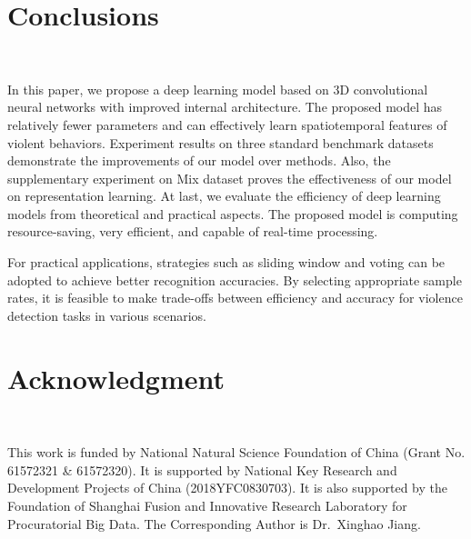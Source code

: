 \documentclass[10pt,twocolumn,letterpaper]{article}
\begin{document}

\section{Conclusions}
~\label{sec:5}

In this paper, we propose a deep learning model based on 3D convolutional neural networks with improved internal architecture. 
The proposed model has relatively fewer parameters and can effectively learn spatiotemporal features of violent behaviors. 
Experiment results on three standard benchmark datasets demonstrate the improvements of our model over methods. 
Also, the supplementary experiment on Mix dataset proves the effectiveness of our model on representation learning. 
At last, we evaluate the efficiency of deep learning models from theoretical and practical aspects.
The proposed model is computing resource-saving, very efficient, and capable of real-time processing. 

For practical applications, strategies such as sliding window and voting can be adopted to achieve better recognition accuracies. 
By selecting appropriate sample rates, it is feasible to make trade-offs between efficiency and accuracy for violence detection tasks in various scenarios.


\section{Acknowledgment}
~\label{sec:6}

This work is funded by National Natural Science Foundation of China (Grant No. 61572321 \& 61572320).
It is supported by National Key Research and Development Projects of China (2018YFC0830703).
It is also supported by the Foundation of Shanghai Fusion and Innovative Research Laboratory for Procuratorial Big Data. 
The Corresponding Author is Dr.~Xinghao Jiang.

\end{document}
